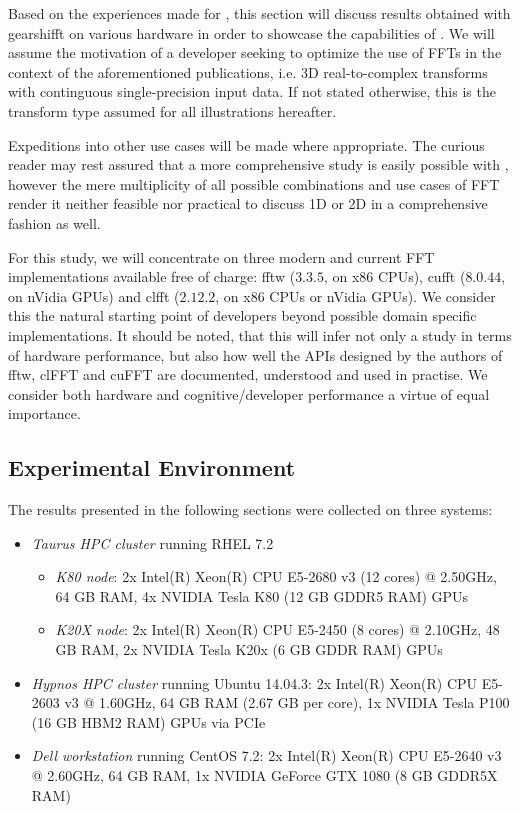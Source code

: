 Based on the experiences made for \cite{preibisch2014efficient, schmid2015real}, this section will discuss results obtained with gearshifft on various hardware in order to showcase the capabilities of \gearshifft{}. We will assume the motivation of a developer seeking to optimize the use of FFTs in the context of the aforementioned publications, i.e. 3D real-to-complex transforms with continguous single-precision input data. If not stated otherwise, this is the transform type assumed for all illustrations hereafter. 

Expeditions into other use cases will be made where appropriate. The curious reader may rest assured that a more comprehensive study is easily possible with \gearshifft{}, however the mere multiplicity of all possible combinations and use cases of FFT render it neither feasible nor practical to discuss 1D or 2D in a comprehensive fashion as well.

For this study, we will concentrate on three modern and current FFT implementations available free of charge: fftw ($3.3.5$, on x86 CPUs), cufft ($8.0.44$, on nVidia GPUs) and clfft ($2.12.2$, on x86 CPUs or nVidia GPUs). We consider this the natural starting point of developers beyond possible domain specific implementations. It should be noted, that this will infer not only a study in terms of hardware performance, but also how well the APIs designed by the authors of fftw, clFFT and cuFFT are documented, understood and used in practise. We consider both hardware and cognitive/developer performance a virtue of equal importance.

\subsection{Experimental Environment}
\label{ssec:env}

The results presented in the following sections were collected on three systems:

\begin{itemize}
\item \emph{Taurus HPC cluster}\cite{taurus} running RHEL 7.2
  \begin{itemize}
  \item \emph{K80 node}: 2x Intel(R) Xeon(R) CPU E5-2680 v3 (12 cores) @ 2.50GHz, 64 GB RAM, 4x NVIDIA Tesla K80 (12 GB GDDR5 RAM) GPUs 
  \item \emph{K20X node}: 2x Intel(R) Xeon(R) CPU E5-2450 (8 cores) @ 2.10GHz, 48 GB RAM, 2x NVIDIA Tesla K20x (6 GB GDDR RAM) GPUs 
  \end{itemize}
\item \emph{Hypnos HPC cluster}\cite{hypnos} running Ubuntu 14.04.3:\newline
  2x Intel(R) Xeon(R) CPU E5-2603 v3 @ 1.60GHz, 64 GB RAM (2.67 GB per core), 1x NVIDIA Tesla P100 (16 GB HBM2 RAM) GPUs via PCIe 
\item  \emph{Dell workstation} running CentOS 7.2:\newline 
  2x Intel(R) Xeon(R) CPU E5-2640 v3 @ 2.60GHz, 64 GB RAM, 1x NVIDIA GeForce GTX 1080 (8 GB GDDR5X RAM)
\end{itemize}

